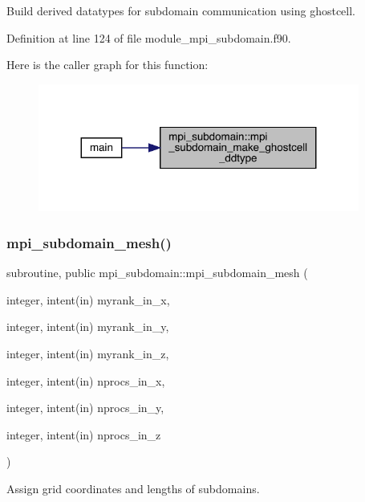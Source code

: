 Build derived datatypes for subdomain communication using ghostcell. 



Definition at line 124 of file module\+\_\+mpi\+\_\+subdomain.\+f90.

Here is the caller graph for this function\+:
\nopagebreak
\begin{figure}[H]
\begin{center}
\leavevmode
\includegraphics[width=299pt]{namespacempi__subdomain_ad788c273d92ea7058caf0874bffdad6d_icgraph}
\end{center}
\end{figure}
\mbox{\label{namespacempi__subdomain_a612331eead74041f174ece9a572c7427}} 
\subsubsection{\texorpdfstring{mpi\_subdomain\_mesh()}{mpi\_subdomain\_mesh()}}
{\footnotesize\ttfamily subroutine, public mpi\+\_\+subdomain\+::mpi\+\_\+subdomain\+\_\+mesh (\begin{DoxyParamCaption}\item[{integer, intent(in)}]{myrank\+\_\+in\+\_\+x,  }\item[{integer, intent(in)}]{myrank\+\_\+in\+\_\+y,  }\item[{integer, intent(in)}]{myrank\+\_\+in\+\_\+z,  }\item[{integer, intent(in)}]{nprocs\+\_\+in\+\_\+x,  }\item[{integer, intent(in)}]{nprocs\+\_\+in\+\_\+y,  }\item[{integer, intent(in)}]{nprocs\+\_\+in\+\_\+z }\end{DoxyParamCaption})}



Assign grid coordinates and lengths of subdomains. 


